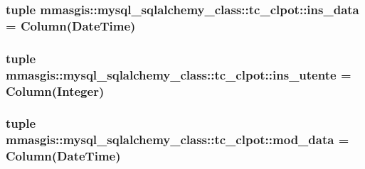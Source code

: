 \label{classmmasgis_1_1mysql__sqlalchemy__class_1_1tc__clpot_a216e67715468109055e5792e45a025f0}
\hypertarget{classmmasgis_1_1mysql__sqlalchemy__class_1_1tc__clpot_a6326e18231afeb88260f4a0604620dee}{
\subsubsection[{ins\_\-data}]{\setlength{\rightskip}{0pt plus 5cm}tuple {\bf mmasgis::mysql\_\-sqlalchemy\_\-class::tc\_\-clpot::ins\_\-data} = Column(DateTime)}}
\label{classmmasgis_1_1mysql__sqlalchemy__class_1_1tc__clpot_a6326e18231afeb88260f4a0604620dee}
\hypertarget{classmmasgis_1_1mysql__sqlalchemy__class_1_1tc__clpot_a7036a3646153a28107ed3f9455503253}{
\subsubsection[{ins\_\-utente}]{\setlength{\rightskip}{0pt plus 5cm}tuple {\bf mmasgis::mysql\_\-sqlalchemy\_\-class::tc\_\-clpot::ins\_\-utente} = Column(Integer)}}
\label{classmmasgis_1_1mysql__sqlalchemy__class_1_1tc__clpot_a7036a3646153a28107ed3f9455503253}
\hypertarget{classmmasgis_1_1mysql__sqlalchemy__class_1_1tc__clpot_a85d1660bc9c9eeea9986432a63a903f5}{
\subsubsection[{mod\_\-data}]{\setlength{\rightskip}{0pt plus 5cm}tuple {\bf mmasgis::mysql\_\-sqlalchemy\_\-class::tc\_\-clpot::mod\_\-data} = Column(DateTime)}}
